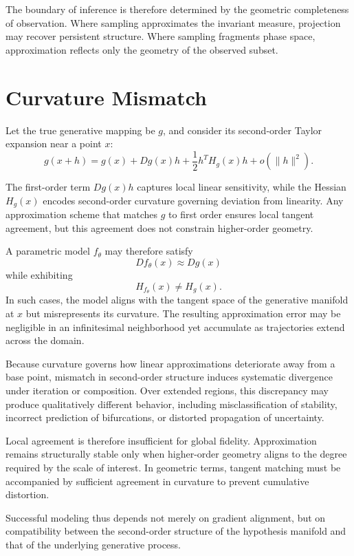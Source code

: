 \documentclass[12pt]{book}
\begin{document}
The boundary of inference is therefore determined by the geometric completeness of observation. Where sampling approximates the invariant measure, projection may recover persistent structure. Where sampling fragments phase space, approximation reflects only the geometry of the observed subset.

\section{Curvature Mismatch}

Let the true generative mapping be $g$, and consider its second-order Taylor expansion near a point $x$:
\[
g(x+h)
=
g(x)
+
Dg(x)h
+
\frac{1}{2} h^T H_g(x) h
+
o(\|h\|^2).
\]

The first-order term $Dg(x)h$ captures local linear sensitivity, while the Hessian $H_g(x)$ encodes second-order curvature governing deviation from linearity. Any approximation scheme that matches $g$ to first order ensures local tangent agreement, but this agreement does not constrain higher-order geometry.

A parametric model $f_\theta$ may therefore satisfy
\[
Df_\theta(x) \approx Dg(x)
\]
while exhibiting
\[
H_{f_\theta}(x) \neq H_g(x).
\]
In such cases, the model aligns with the tangent space of the generative manifold at $x$ but misrepresents its curvature. The resulting approximation error may be negligible in an infinitesimal neighborhood yet accumulate as trajectories extend across the domain.

Because curvature governs how linear approximations deteriorate away from a base point, mismatch in second-order structure induces systematic divergence under iteration or composition. Over extended regions, this discrepancy may produce qualitatively different behavior, including misclassification of stability, incorrect prediction of bifurcations, or distorted propagation of uncertainty.

Local agreement is therefore insufficient for global fidelity. Approximation remains structurally stable only when higher-order geometry aligns to the degree required by the scale of interest. In geometric terms, tangent matching must be accompanied by sufficient agreement in curvature to prevent cumulative distortion.

Successful modeling thus depends not merely on gradient alignment, but on compatibility between the second-order structure of the hypothesis manifold and that of the underlying generative process.
\end{document}
